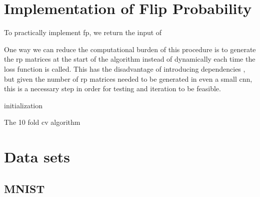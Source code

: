 
\section{Implementation of Flip Probability}

To practically implement \gls{fp}, we return the input of



One way we can reduce the computational burden of this procedure is to generate the \gls{rp} matrices at the start of the algorithm instead of dynamically each time the loss function is called. This has the disadvantage of introducing dependencies \cite{bob_rp_storage}, but given the number of \gls{rp} matrices needed to be generated in even a small \gls{cnn}, this is a necessary step in order for testing and iteration to be feasible. 
\bigskip

\begin{algorithm}[H]
\SetAlgoLined
{}
 initialization\;
    \caption{The 10 fold \gls{cv} algorithm}
    \label{algo:fp_python_1}
\end{algorithm}

\section{Data sets}
 
%

 \subsection{MNIST}
 
